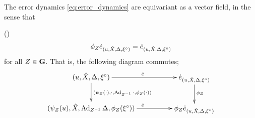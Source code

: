 \documentclass{article}
\begin{document}
\begin{proposition} %
The error dynamics \eqref{eq:error_dynamics} are equivariant as a vector field, in the sense that

()
\begin{align*}
    \phi_Z \dot{e}_{(u, \hat{X}, \Delta, {\xi}^\circ)}
    = \dot{e}_{(u, \hat{X}, \Delta, {\xi}^\circ)}
\end{align*}
for all $Z \in \mathbf{G}$.
That is, the following diagram commutes;
\[
\xymatrixcolsep{50pt}\xymatrix{
(u, \hat{X}, \Delta, \mr{\xi})
\ar[d]^{(\psi_Z(\cdot), \cdot, \Ad_{Z^{-1}}\cdot, \phi_Z(\cdot))}
\ar[r]^{\dot{e}}
&
\dot{e}_{(u, \hat{X}, \Delta, \mr{\xi})}
\ar[d]^{\phi_Z}
\\
(\psi_Z(u), \hat{X}, \Ad_{Z^{-1}} \Delta, \phi_Z(\mr{\xi}))
\ar[r]^{\dot{e}}
&
\phi_Z \dot{e}_{(u, \hat{X}, \Delta, \mr{\xi})}
}
\]
\end{proposition}

\end{document}
